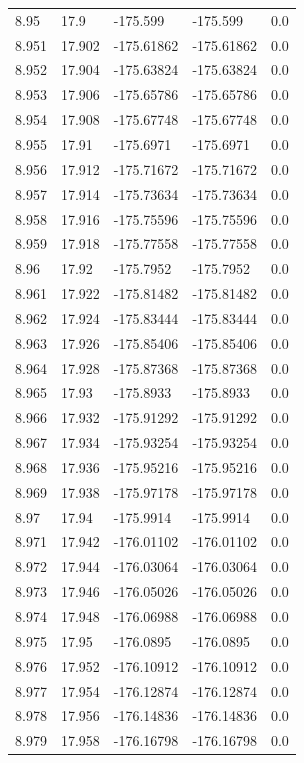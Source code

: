 \begin{tabular}{lllll}
8.95 & 17.9 & -175.599 & -175.599 & 0.0 \\
8.951 & 17.902 & -175.61862 & -175.61862 & 0.0 \\
8.952 & 17.904 & -175.63824 & -175.63824 & 0.0 \\
8.953 & 17.906 & -175.65786 & -175.65786 & 0.0 \\
8.954 & 17.908 & -175.67748 & -175.67748 & 0.0 \\
8.955 & 17.91 & -175.6971 & -175.6971 & 0.0 \\
8.956 & 17.912 & -175.71672 & -175.71672 & 0.0 \\
8.957 & 17.914 & -175.73634 & -175.73634 & 0.0 \\
8.958 & 17.916 & -175.75596 & -175.75596 & 0.0 \\
8.959 & 17.918 & -175.77558 & -175.77558 & 0.0 \\
8.96 & 17.92 & -175.7952 & -175.7952 & 0.0 \\
8.961 & 17.922 & -175.81482 & -175.81482 & 0.0 \\
8.962 & 17.924 & -175.83444 & -175.83444 & 0.0 \\
8.963 & 17.926 & -175.85406 & -175.85406 & 0.0 \\
8.964 & 17.928 & -175.87368 & -175.87368 & 0.0 \\
8.965 & 17.93 & -175.8933 & -175.8933 & 0.0 \\
8.966 & 17.932 & -175.91292 & -175.91292 & 0.0 \\
8.967 & 17.934 & -175.93254 & -175.93254 & 0.0 \\
8.968 & 17.936 & -175.95216 & -175.95216 & 0.0 \\
8.969 & 17.938 & -175.97178 & -175.97178 & 0.0 \\
8.97 & 17.94 & -175.9914 & -175.9914 & 0.0 \\
8.971 & 17.942 & -176.01102 & -176.01102 & 0.0 \\
8.972 & 17.944 & -176.03064 & -176.03064 & 0.0 \\
8.973 & 17.946 & -176.05026 & -176.05026 & 0.0 \\
8.974 & 17.948 & -176.06988 & -176.06988 & 0.0 \\
8.975 & 17.95 & -176.0895 & -176.0895 & 0.0 \\
8.976 & 17.952 & -176.10912 & -176.10912 & 0.0 \\
8.977 & 17.954 & -176.12874 & -176.12874 & 0.0 \\
8.978 & 17.956 & -176.14836 & -176.14836 & 0.0 \\
8.979 & 17.958 & -176.16798 & -176.16798 & 0.0 \\

\end{tabular}

